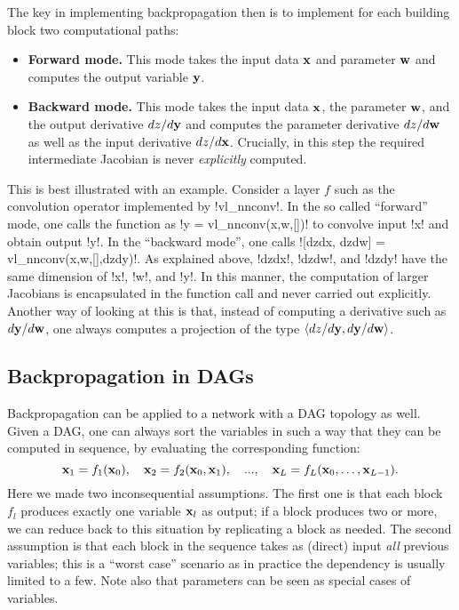 The key in implementing backpropagation then is to implement for each building block two computational paths:
\begin{itemize}
	\item \textbf{Forward mode.} This mode takes the input data $\mathbf{x}$ and parameter $\mathbf{w}$ and computes the output variable $\mathbf{y}$.
	\item \textbf{Backward mode.} This mode takes the input data $\mathbf{x}$,  the parameter $\mathbf{w}$, and the output derivative $dz / d \mathbf{y}$ and computes the parameter derivative $dz / d \mathbf{w}$ as well as the input derivative $dz / d \mathbf{x}$. Crucially, in this step the required intermediate Jacobian is never \emph{explicitly} computed.
\end{itemize}
 This is best illustrated with an example. Consider a layer $f$ such as the convolution operator implemented by !vl_nnconv!. In the so called ``forward'' mode, one calls the function as !y = vl_nnconv(x,w,[])! to convolve input !x! and obtain output !y!. In the ``backward mode'', one calls ![dzdx, dzdw] = vl_nnconv(x,w,[],dzdy)!.  As explained above, !dzdx!, !dzdw!, and !dzdy! have the same dimension of !x!, !w!, and !y!. In this manner, the computation of larger Jacobians is encapsulated in the function call and never carried out explicitly. Another way of looking at this is that, instead of computing a derivative such as $d\mathbf{y}/d\mathbf{w}$, one always computes a projection of the type $\langle dz/d\mathbf{y}, d\mathbf{y}/d\mathbf{w}\rangle$.

\subsection{Backpropagation in DAGs}\label{s:dag}

Backpropagation can be applied to a network with a DAG topology as well. Given a DAG, one can always sort the variables in such a way that they can be computed in sequence, by evaluating the corresponding function:
\[
\mathbf{x}_1 = f_1(\mathbf{x}_0),
\quad
\mathbf{x}_2 = f_2(\mathbf{x}_0,\mathbf{x}_1),
\quad
...,
\quad
\mathbf{x}_L = f_L(\mathbf{x}_0,\dots,\mathbf{x}_{L-1}).
\]
Here we made two inconsequential assumptions. The first one is that each block $f_l$ produces exactly one variable $\mathbf{x}_l$ as output; if a block produces two or more, we can reduce back to this situation by replicating a block as needed. The second assumption is that each block in the sequence takes as (direct) input \emph{all} previous variables; this is a ``worst case'' scenario as in practice the dependency is usually limited to a few. Note also that parameters can be seen as special cases of variables.

